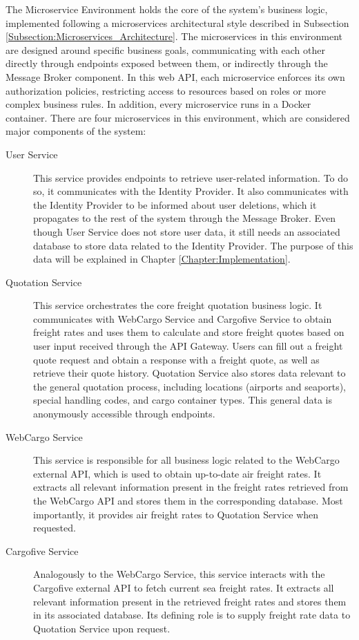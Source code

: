 \documentclass[12pt, reqno]{amsbook}
\theoremstyle{definition}
\theoremstyle{definition}
\numberwithin{section}{chapter}
\numberwithin{table}{chapter}
\numberwithin{figure}{chapter}
\begin{document}
The Microservice Environment holds the core of the system's business logic, implemented following a microservices architectural style described in Subsection \ref{Subsection:Microservices_Architecture}. The microservices in this environment are designed around specific business goals, communicating with each other directly through endpoints exposed between them, or indirectly through the Message Broker component. In this web \ac{API}, each microservice enforces its own authorization policies, restricting access to resources based on roles or more complex business rules. In addition, every microservice runs in a Docker container.
There are four microservices in this environment, which are considered major components of the system:
\begin{description}
  \item[User Service] This service provides endpoints to retrieve user-related information. To do so, it communicates with the Identity Provider. It also communicates with the Identity Provider to be informed about user deletions, which it propagates to the rest of the system through the Message Broker. Even though User Service does not store user data, it still needs an associated database to store data related to the Identity Provider. The purpose of this data will be explained in Chapter \ref{Chapter:Implementation}.
  \item[Quotation Service] This service orchestrates the core freight quotation business logic. It communicates with WebCargo Service and Cargofive Service to obtain freight rates and uses them to calculate and store freight quotes based on user input received through the \ac{API} Gateway. Users can fill out a freight quote request and obtain a response with a freight quote, as well as retrieve their quote history. Quotation Service also stores data relevant to the general quotation process, including locations (airports and seaports), special handling codes, and cargo container types. This general data is anonymously accessible through endpoints.
  \item[WebCargo Service] This service is responsible for all business logic related to the WebCargo external \ac{API}, which is used to obtain up-to-date air freight rates. It extracts all relevant information present in the freight rates retrieved from the WebCargo \ac{API} and stores them in the corresponding database. Most importantly, it provides air freight rates to Quotation Service when requested.
  \item[Cargofive Service] Analogously to the WebCargo Service, this service interacts with the Cargofive external \ac{API} to fetch current sea freight rates. It extracts all relevant information present in the retrieved freight rates and stores them in its associated database. Its defining role is to supply freight rate data to Quotation Service upon request.
\end{description}
\end{document}
